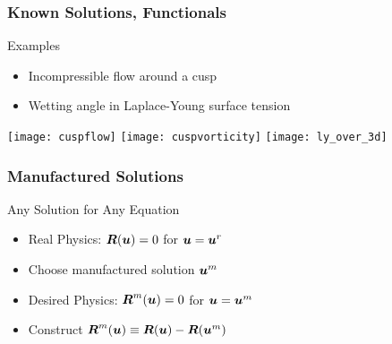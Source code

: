 \begin{frame}
\frametitle{Known Solutions, Functionals}
\begin{block}{Examples}
\begin{itemize}
\item Incompressible flow around a cusp
\item Wetting angle in Laplace-Young surface tension
\end{itemize}
\end{block}

\texttt{[image: cuspflow]}
\texttt{[image: cuspvorticity]}
\texttt{[image: ly\_over\_3d]}

\end{frame}

\begin{frame}
\frametitle{Manufactured Solutions}
\begin{block}{Any Solution for Any Equation}
\begin{itemize}
\item Real Physics: ${\boldsymbol{R}}({\boldsymbol{u}}) = 0$ for ${\boldsymbol{u}} = {\boldsymbol{u}}^r$
\item Choose manufactured solution ${\boldsymbol{u}}^m$
\item Desired Physics: ${\boldsymbol{R}}^m({\boldsymbol{u}}) = 0$ for ${\boldsymbol{u}} = {\boldsymbol{u}}^m$
\item Construct ${\boldsymbol{R}}^m({\boldsymbol{u}}) \equiv {\boldsymbol{R}}({\boldsymbol{u}}) - {\boldsymbol{R}}({\boldsymbol{u}}^m)$
\end{itemize}
\end{block}

\end{frame}

